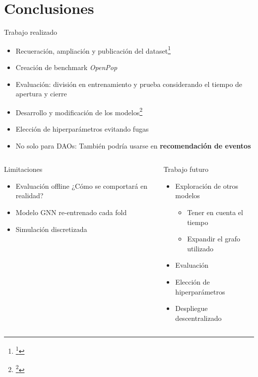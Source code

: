 \section{Conclusiones}

\begin{frame}{Trabajo realizado}
    \begin{itemize}
        \item Recueración, ampliación y publicación del dataset\footnote{\footcite{tfm-dataset-text}}
        \item Creación de benchmark \textit{OpenPop}
        \item Evaluación: división en entrenamiento y prueba considerando el tiempo de apertura y cierre
        \item Desarrollo y modificación de los modelos\footnote{\footcite{davo_daviddavoupm-tfm-notebooks_2024}}
        \item Elección de hiperparámetros evitando fugas
        \item No solo para DAOs: También podría usarse en \textbf{recomendación de eventos}
    \end{itemize}
\end{frame}

\begin{frame}
    \begin{columns}
        \begin{alertblock}{Limitaciones}
            \begin{itemize}
                \item Evaluación offline \textrightarrow ¿Cómo se comportará en realidad?
                \item Modelo GNN re-entrenado cada fold
                \item Simulación discretizada
            \end{itemize} 
        \end{alertblock}
        \pause
        \begin{exampleblock}{Trabajo futuro}
            \begin{itemize}
                \item Exploración de otros modelos
                \begin{itemize}
                    \item Tener en cuenta el tiempo
                    \item Expandir el grafo utilizado
                \end{itemize}
                \item Evaluación
                \item Elección de hiperparámetros
                \item Despliegue descentralizado\footnotemark
            \end{itemize}
        \end{exampleblock}
    \end{columns}
\end{frame}

